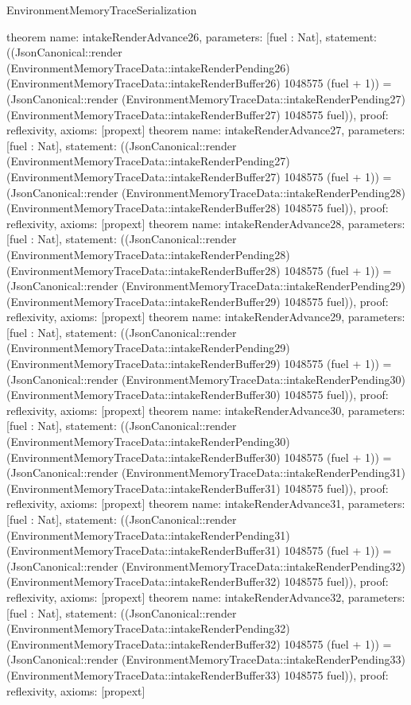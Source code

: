 \begin{lexlean}{EnvironmentMemoryTraceSerialization}
\begin{semanticmodule}
{}
theorem{
 name: intakeRenderAdvance26, parameters: [fuel : Nat],
 statement: ((JsonCanonical::render (EnvironmentMemoryTraceData::intakeRenderPending26) (EnvironmentMemoryTraceData::intakeRenderBuffer26) 1048575 (fuel + 1)) = (JsonCanonical::render (EnvironmentMemoryTraceData::intakeRenderPending27) (EnvironmentMemoryTraceData::intakeRenderBuffer27) 1048575 fuel)), proof: reflexivity{}, axioms: [propext]
}
theorem{
 name: intakeRenderAdvance27, parameters: [fuel : Nat],
 statement: ((JsonCanonical::render (EnvironmentMemoryTraceData::intakeRenderPending27) (EnvironmentMemoryTraceData::intakeRenderBuffer27) 1048575 (fuel + 1)) = (JsonCanonical::render (EnvironmentMemoryTraceData::intakeRenderPending28) (EnvironmentMemoryTraceData::intakeRenderBuffer28) 1048575 fuel)), proof: reflexivity{}, axioms: [propext]
}
theorem{
 name: intakeRenderAdvance28, parameters: [fuel : Nat],
 statement: ((JsonCanonical::render (EnvironmentMemoryTraceData::intakeRenderPending28) (EnvironmentMemoryTraceData::intakeRenderBuffer28) 1048575 (fuel + 1)) = (JsonCanonical::render (EnvironmentMemoryTraceData::intakeRenderPending29) (EnvironmentMemoryTraceData::intakeRenderBuffer29) 1048575 fuel)), proof: reflexivity{}, axioms: [propext]
}
theorem{
 name: intakeRenderAdvance29, parameters: [fuel : Nat],
 statement: ((JsonCanonical::render (EnvironmentMemoryTraceData::intakeRenderPending29) (EnvironmentMemoryTraceData::intakeRenderBuffer29) 1048575 (fuel + 1)) = (JsonCanonical::render (EnvironmentMemoryTraceData::intakeRenderPending30) (EnvironmentMemoryTraceData::intakeRenderBuffer30) 1048575 fuel)), proof: reflexivity{}, axioms: [propext]
}
theorem{
 name: intakeRenderAdvance30, parameters: [fuel : Nat],
 statement: ((JsonCanonical::render (EnvironmentMemoryTraceData::intakeRenderPending30) (EnvironmentMemoryTraceData::intakeRenderBuffer30) 1048575 (fuel + 1)) = (JsonCanonical::render (EnvironmentMemoryTraceData::intakeRenderPending31) (EnvironmentMemoryTraceData::intakeRenderBuffer31) 1048575 fuel)), proof: reflexivity{}, axioms: [propext]
}
theorem{
 name: intakeRenderAdvance31, parameters: [fuel : Nat],
 statement: ((JsonCanonical::render (EnvironmentMemoryTraceData::intakeRenderPending31) (EnvironmentMemoryTraceData::intakeRenderBuffer31) 1048575 (fuel + 1)) = (JsonCanonical::render (EnvironmentMemoryTraceData::intakeRenderPending32) (EnvironmentMemoryTraceData::intakeRenderBuffer32) 1048575 fuel)), proof: reflexivity{}, axioms: [propext]
}
theorem{
 name: intakeRenderAdvance32, parameters: [fuel : Nat],
 statement: ((JsonCanonical::render (EnvironmentMemoryTraceData::intakeRenderPending32) (EnvironmentMemoryTraceData::intakeRenderBuffer32) 1048575 (fuel + 1)) = (JsonCanonical::render (EnvironmentMemoryTraceData::intakeRenderPending33) (EnvironmentMemoryTraceData::intakeRenderBuffer33) 1048575 fuel)), proof: reflexivity{}, axioms: [propext]
}
\end{semanticmodule}
\end{lexlean}
